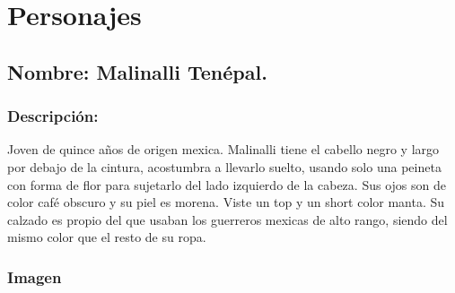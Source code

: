 \documentclass[11pt,letterpaper]{article}
\begin{document}
\section{Personajes}

\subsection{Nombre: Malinalli Tenépal.}  
	\subsubsection{Descripción:}
Joven de quince años de origen mexica. Malinalli tiene el cabello negro y largo por debajo de la cintura, acostumbra a llevarlo suelto, usando solo una peineta con forma de flor para sujetarlo del lado izquierdo de la cabeza. Sus ojos son de color café obscuro y su piel es morena. Viste un top y un short color manta. Su calzado es propio del que usaban los guerreros mexicas de alto rango, siendo del mismo color que el resto de su ropa.   
\subsubsection{Imagen}
\end{document}
